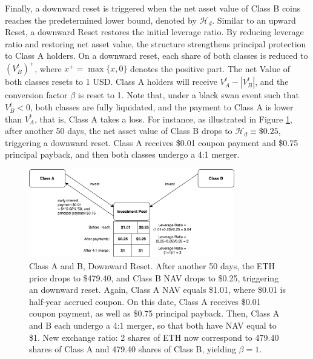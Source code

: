 \documentclass[final,pdftex]{ectaart}
\theoremstyle{plain}
\begin{document}
Finally, a downward reset is triggered when the net asset value of Class B coins reaches the predetermined lower bound, denoted by $\mathcal{H}_{d}$. Similar to an upward Reset, a downward Reset restores the initial leverage ratio. By reducing leverage ratio and restoring net asset value, the structure strengthens principal protection to Class A holders. On a downward reset, each share of both classes is reduced to $(V_{B}^t)^+$, where $x^+=\max\{x,0\}$ denotes the positive part. The net Value of both classes resets to 1 USD. Class A holders will receive $V_{A}^{t}-|V_{B}^{t}|$, and the conversion factor $\beta$ is reset to 1. Note that, under a black swan event such that $V_B^t<0$, both classes are fully liquidated, and the payment to Class A is lower than $V_A^t$, that is, Class A takes a loss. For instance, as illustrated in Figure \ref{fig:downward}, after another 50 days, the net asset value of Class B drops to $\mathcal{H}_{d}\equiv \$0.25$, triggering a downward reset. Class A receives \$0.01 coupon payment and \$0.75 principal payback, and then both classes undergo a 4:1 merger.

\begin{figure}[h]
	\centering
	\includegraphics[width=0.8\textwidth]{downward}
	\caption{Class A and B, Downward Reset. After another 50 days, the ETH price drops to \$479.40, and Class B NAV drops to \$0.25, triggering an downward reset. Again, Class A NAV equals \$1.01, where \$0.01 is half-year accrued coupon. On this date, Class A receives \$0.01 coupon payment, as well as \$0.75 principal payback. Then, Class A and B each undergo a 4:1 merger, so that both have NAV equal to \$1. New exchange ratio: 2 shares of ETH now correspond to 479.40 shares of Class A and 479.40 shares of Class B, yielding $\beta=1$.}\label{fig:downward}
\end{figure}
\end{document}
